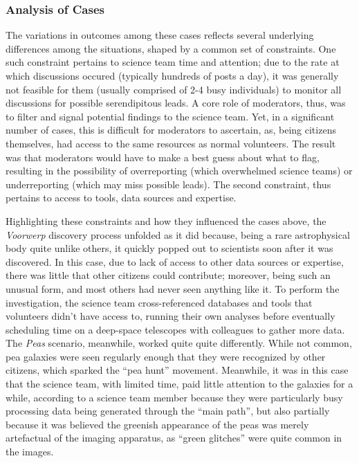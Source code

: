 \documentclass{sigchi}
\begin{document}
\subsubsection{Analysis of Cases}

The variations in outcomes among these cases reflects several underlying differences among the situations, shaped by a common set of constraints.  One such constraint pertains to science team time and attention; due to the rate at which discussions occured (typically hundreds of posts a day), it was generally not feasible for them (usually comprised of 2-4 busy individuals) to monitor all discussions for possible serendipitous leads.  A core role of moderators, thus, was to filter and signal potential findings to the science team.  Yet, in a significant number of cases, this is difficult for moderators to ascertain, as, being citizens themselves, had access to the same resources as normal volunteers. The result was that moderators would have to make a best guess about what to flag, resulting in the possibility of overreporting (which overwhelmed science teams) or underreporting (which may miss possible leads).  The second constraint, thus pertains to access to tools, data sources and expertise. 

Highlighting these constraints and how they influenced the cases above, the \emph{Voorwerp} discovery process unfolded as it did because, being a rare astrophysical body quite unlike others, it quickly popped out to scientists soon after it was discovered.  In this case, due to lack of access to other data sources or expertise, there was little that other citizens could contribute; moreover, being such an unusual form, and most others had never seen anything like it. To perform the investigation, the science team cross-referenced databases and tools that volunteers didn't have access to, running their own analyses before eventually scheduling time on a deep-space telescopes with colleagues to gather more data.  The \emph{Peas} scenario, meanwhile, worked quite quite differently.  While not common, pea galaxies were seen regularly enough that they were recognized by other citizens, which sparked the ``pea hunt'' movement. Meanwhile, it was in this case that the science team, with limited time, paid little attention to the galaxies for a while, according to a science team member because they were particularly busy processing data being generated through the ``main path'', but also partially because it was believed the greenish appearance of the peas was merely artefactual of the imaging apparatus, as ``green glitches'' were quite common in the images. 
\end{document}
